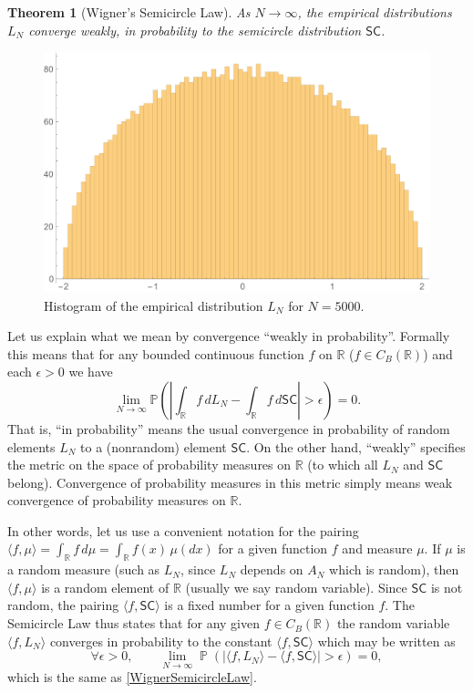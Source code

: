 \documentclass[letterpaper,11pt,oneside,reqno]{amsart}
\numberwithin{equation}{section}
\newcommand{\SC}{\mathsf{SC}}
\DeclareMathOperator{\PP}{\mathbb{P}}
\newtheorem{theorem}[proposition]{Theorem}
\theoremstyle{definition}
\begin{document}
\begin{theorem}[Wigner's Semicircle Law]\label{thm:SemicircleLaw}
	As $N\to\infty$,
	the empirical distributions 
	$L_N$ converge weakly, in probability to the 
	semicircle distribution $\SC$.
\end{theorem}

\begin{figure}[htbp]
	\includegraphics[width=.5\textwidth]{img/Wigner1.pdf}
	\caption{Histogram of the empirical distribution 
	$L_N$ for $N=5000$.}
	\label{fig:Wigner}
\end{figure}

Let us explain what we mean by convergence ``weakly in probability''. Formally this means that
for any bounded continuous function $f$ on $\mathbb R$ ($f\in C_B(\mathbb R)$) and each $\epsilon>0$ we have 
\begin{equation}\label{WignerSemicircleLaw}
\lim_{N\to\infty}\mathbb P\left(\left|\int_{\mathbb R} f\,dL_N-\int_{\mathbb R} f\,d\SC\right|>\epsilon\right)=0.
\end{equation}
That is, ``in probability'' means the usual convergence in probability  of
random elements $L_N$ to a (nonrandom) element $\SC$.  On the other hand,
``weakly'' specifies the metric on the space of probability measures on
$\mathbb{R}$ (to which all $L_N$ and $\SC$ belong). Convergence of probability
measures in this metric simply means weak convergence of probability measures
on $\mathbb{R}$.

In other words,
let us use a convenient notation for the pairing $\langle f,\mu\rangle
=\int_{\mathbb R} f\,d\mu=\int_{\mathbb R}f(x)\,\mu(dx)$ for a given
function $f$ and measure $\mu$.  If $\mu$ is a random measure (such as $L_N$,
since $L_N$ depends on $A_N$ which is random), then $\langle f,\mu\rangle$ is
a random element of $\mathbb R$ (usually we say random variable).  Since $\SC$
is not random, the pairing $\langle f,\SC\rangle$ is a fixed number for a given function $f$.  The
Semicircle Law thus states that for any given $f\in C_B(\mathbb R)$ the random variable
$\langle f,L_N\rangle$ converges in probability to the constant $\langle f,\SC\rangle$ which may be written as
\begin{equation*}
\forall \epsilon>0,\qquad \lim_{N\to\infty}\PP\left(\left|\langle f,L_N\rangle-\langle f,\SC\rangle\right|>\epsilon\right)=0,
\end{equation*}
which is the same as \eqref{WignerSemicircleLaw}.
\end{document}

